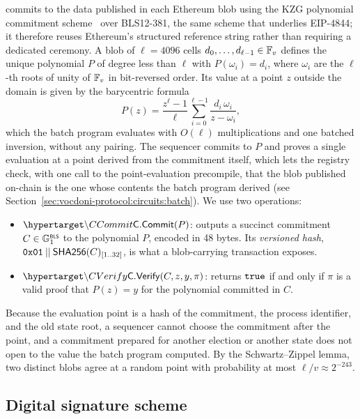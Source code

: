 \davinci commits to the data published in each Ethereum blob using the KZG polynomial commitment scheme~\cite{kate2010constant} over BLS12-381, the same scheme that underlies EIP-4844; it therefore reuses Ethereum's structured reference string rather than requiring a dedicated ceremony. A blob of $\ell = 4096$ cells $d_0, \dots, d_{\ell-1} \in \mathbb{F}_v$ defines the unique polynomial $P$ of degree less than $\ell$ with $P(\omega_i) = d_i$, where $\omega_i$ are the $\ell$-th roots of unity of $\mathbb{F}_v$ in bit-reversed order. Its value at a point $z$ outside the domain is given by the barycentric formula
\[
P(z) = \frac{z^\ell - 1}{\ell} \sum_{i=0}^{\ell-1} \frac{d_i\, \omega_i}{z - \omega_i},
\]
which the batch program evaluates with $O(\ell)$ multiplications and one batched inversion, without any pairing. The sequencer commits to $P$ and proves a single evaluation at a point derived from the commitment itself, which lets the registry check, with one call to the point-evaluation precompile, that the blob published on-chain is the one whose contents the batch program derived (see Section~\ref{sec:vocdoni-protocol:circuits:batch}). We use two operations:
\begin{itemize}
	\item $\hlset{\CCommit}(P)$: outputs a succinct commitment $C \in {\mathbb{G}}^{\text{\tiny \sf BLS}}_1$ to the polynomial $P$, encoded in 48 bytes. Its \emph{versioned hash}, $\texttt{0x01} \:||\: {\sf{SHA256}}(C)_{[1..32]}$, is what a blob-carrying transaction exposes.
	\item $\hlset{\CVerify}(C, z, y, \pi)$: returns $\texttt{true}$ if and only if $\pi$ is a valid proof that $P(z) = y$ for the polynomial committed in $C$.
\end{itemize}
Because the evaluation point is a hash of the commitment, the process identifier, and the old state root, a sequencer cannot choose the commitment after the point, and a commitment prepared for another election or another state does not open to the value the batch program computed. By the Schwartz--Zippel lemma, two distinct blobs agree at a random point with probability at most $\ell / v \approx 2^{-243}$.

\subsection{Digital signature scheme}
\label{sec:cryptographic-primitives:signatures}

